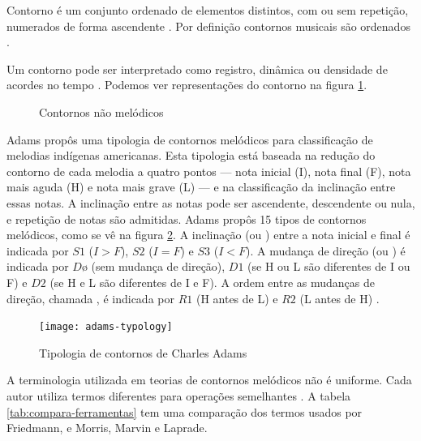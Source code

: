 Contorno é um conjunto ordenado de elementos distintos, com ou sem
repetição, numerados de forma ascendente
\cite[p. 206]{morris93:directions}. Por definição contornos musicais
são ordenados \cite[p. 228]{marvin.ea87:relating}.

Um contorno pode ser interpretado como registro, dinâmica ou densidade
de acordes no tempo \cite[p. 206]{morris93:directions}
\cite[p. 22]{clifford95:contour}. Podemos ver representações do
contorno  na figura
\ref{fig:non-melodic-contours}.

\begin{figure}
  \centering

  \caption{Contornos  não melódicos}
  \label{fig:non-melodic-contours}
\end{figure}

Adams propôs uma tipologia de contornos melódicos para classificação
de melodias indígenas americanas. Esta tipologia está baseada na
redução do contorno de cada melodia a quatro pontos --- nota inicial
(I), nota final (F), nota mais aguda (H) e nota mais grave (L) --- e
na classificação da inclinação entre essas notas. A inclinação entre
as notas pode ser ascendente, descendente ou nula, e repetição de
notas são admitidas. Adams propôs 15 tipos de contornos melódicos,
como se vê na figura \ref{fig:adams-typology}. A inclinação (ou
) entre a nota inicial e final é indicada por $S1$ ($I >
F$), $S2$ ($I = F$) e $S3$ ($I < F$). A mudança de direção (ou
) é indicada por $Dø$ (sem mudança de direção), $D1$
(se H ou L são diferentes de I ou F) e $D2$ (se H e L são diferentes
de I e F). A ordem entre as mudanças de direção, chamada
, é indicada por $R1$ (H antes de L) e $R2$ (L antes
de H) \cite{adams76:melodic}.

\begin{figure}
  \centering
  \texttt{[image: adams-typology]}
  \caption{Tipologia de contornos de Charles Adams}
  \label{fig:adams-typology}
\end{figure}

A terminologia utilizada em teorias de contornos melódicos não é
uniforme. Cada autor utiliza termos diferentes para operações
semelhantes \cite{friedmann87:response}. A tabela
\ref{tab:compara-ferramentas} tem uma comparação dos termos usados por
Friedmann, e Morris, Marvin e Laprade.

